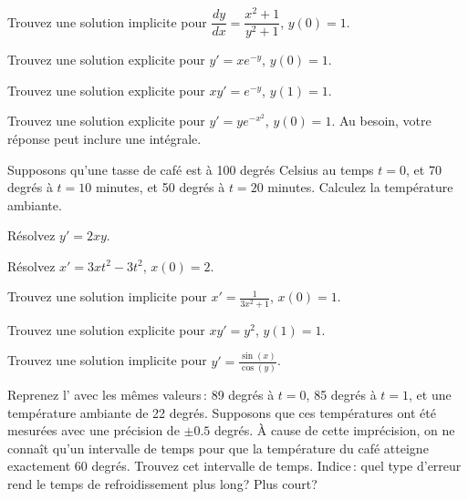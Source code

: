 \begin{exercise}
Trouvez une solution implicite pour
$\dfrac{dy}{dx} = \dfrac{x^2+1}{y^2+1}$, $y(0) = 1$.
\end{exercise}

\begin{exercise}
Trouvez une solution explicite pour $y' = xe^{-y}$, $y(0)=1$.
\end{exercise}

\begin{exercise}
Trouvez une solution explicite pour $xy' = e^{-y}$, $y(1)=1$.
\end{exercise}

\begin{exercise}
Trouvez une solution explicite pour $y' = ye^{-x^2}$, $y(0)=1$.  Au besoin, votre réponse peut inclure une intégrale.
\end{exercise}

\begin{exercise}
Supposons qu'une tasse de café est à 100 degrés Celsius au temps $t=0$,
et 70 degrés à $t=10$ minutes, et 50 degrés à $t=20$
minutes.  Calculez la température ambiante.
\end{exercise}

\setcounter{exercise}{100}

\begin{exercise}
Résolvez $y'=2xy$.
\end{exercise}

\begin{exercise}
Résolvez $x'=3xt^2-3t^2$, $x(0)=2$.
\end{exercise}

\begin{exercise}
Trouvez une solution implicite pour 
$x'=\frac{1}{3x^2+1}$, $x(0)=1$.
\end{exercise}

\begin{exercise}
Trouvez une solution explicite pour $x y' = y^2$, $y(1) = 1$.
\end{exercise}

\begin{exercise}
Trouvez une solution implicite pour $y' = \frac{\sin(x)}{\cos(y)}$.
\end{exercise}

\begin{exercise}
Reprenez l' avec les mêmes valeurs\,: 89 degrés à 
$t=0$, 85 degrés à $t=1$, et une température ambiante de 22 degrés. 
Supposons que ces températures ont été mesurées avec une précision de 
$\pm 0.5$ degrés.  À cause de cette imprécision, on ne connaît qu'un intervalle de temps pour que la température du 
café atteigne exactement 60 degrés.  Trouvez cet intervalle de temps.  Indice\,: quel type d'erreur rend le temps de refroidissement plus long? Plus court? 
\end{exercise}

